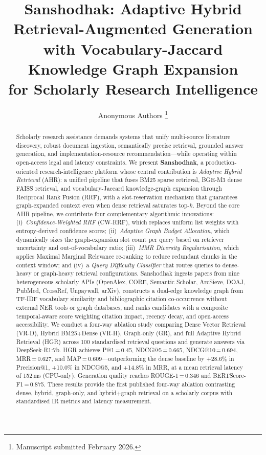 \documentclass[journal]{IEEEtran}
\title{Sanshodhak: Adaptive Hybrid Retrieval-Augmented Generation\\
       with Vocabulary-Jaccard Knowledge Graph Expansion\\
       for Scholarly Research Intelligence}
\author{Anonymous Authors%
\thanks{Manuscript submitted February 2026.}}
\begin{document}
\maketitle

\begin{abstract}
Scholarly research assistance demands systems that unify multi-source
literature discovery, robust document ingestion, semantically precise
retrieval, grounded answer generation, and implementation-resource
recommendation—while operating within open-access legal and latency
constraints. We present \textbf{Sanshodhak}, a production-oriented
research-intelligence platform whose central contribution is
\emph{Adaptive Hybrid Retrieval} (AHR): a unified pipeline that fuses
BM25 sparse retrieval, BGE-M3 dense FAISS retrieval, and
vocabulary-Jaccard knowledge-graph expansion through Reciprocal Rank
Fusion (RRF), with a slot-reservation mechanism that guarantees
graph-expanded context even when dense retrieval saturates top-$k$.
Beyond the core AHR pipeline, we contribute four complementary
algorithmic innovations: (i)~\emph{Confidence-Weighted RRF}
(CW-RRF), which replaces uniform list weights with entropy-derived
confidence scores; (ii)~\emph{Adaptive Graph Budget Allocation},
which dynamically sizes the graph-expansion slot count per query
based on retriever uncertainty and out-of-vocabulary ratio;
(iii)~\emph{MMR Diversity Regularisation}, which applies Maximal
Marginal Relevance re-ranking to reduce redundant chunks in the
context window; and (iv)~a \emph{Query Difficulty Classifier} that
routes queries to dense-heavy or graph-heavy retrieval
configurations.
Sanshodhak ingests papers from nine heterogeneous scholarly APIs
(OpenAlex, CORE, Semantic Scholar, ArcSieve, DOAJ, PubMed, CrossRef,
Unpaywall, arXiv), constructs a dual-edge knowledge graph from TF-IDF
vocabulary similarity and bibliographic citation co-occurrence without
external NER tools or graph databases, and ranks candidates with a
composite temporal-aware score weighting citation impact, recency
decay, and open-access accessibility. We conduct a four-way ablation
study comparing Dense Vector Retrieval (VR-D), Hybrid BM25+Dense
(VR-H), Graph-only (GR), and full Adaptive Hybrid Retrieval
(HGR) across 100 standardised retrieval questions and generate answers
via DeepSeek-R1:7b. HGR achieves
P@1\,=\,0.45, NDCG@5\,=\,0.665, NDCG@10\,=\,0.694, MRR\,=\,0.627,
and MAP\,=\,0.609---outperforming the dense baseline by +28.6\% in
Precision@1, +10.0\% in NDCG@5, and +14.8\% in MRR, at a mean
retrieval latency of 152\,ms (CPU-only). Generation quality
reaches ROUGE-1\,=\,0.346 and BERTScore-F1\,=\,0.875. These results provide the first
published four-way ablation contrasting dense, hybrid,
graph-only, and hybrid+graph retrieval on a scholarly corpus with
standardised IR metrics and latency measurement.
\end{abstract}
\end{document}
